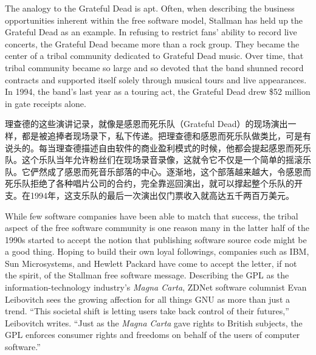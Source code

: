 \ifdefined\eng
The analogy to the Grateful Dead is apt. Often, when describing the business opportunities inherent within the free software model, Stallman has held up the Grateful Dead as an example. In refusing to restrict fans' ability to record live concerts, the Grateful Dead became more than a rock group. They became the center of a tribal community dedicated to Grateful Dead music. Over time, that tribal community became so large and so devoted that the band shunned record contracts and supported itself solely through musical tours and live appearances. In 1994, the band's last year as a touring act, the Grateful Dead drew \$52 million in gate receipts alone.
\fi

\ifdefined\chs
理查德的这些演讲记录，就像是感恩而死乐队（Grateful Dead）的现场演出一样，都是被追捧者现场录下，私下传递。把理查德和感恩而死乐队做类比，可是有说头的。每当理查德描述自由软件的商业盈利模式的时候，他都会提起感恩而死乐队。这个乐队当年允许粉丝们在现场录音录像，这就令它不仅是一个简单的摇滚乐队。它俨然成了感恩而死音乐部落的中心。逐渐地，这个部落越来越大，令感恩而死乐队拒绝了各种唱片公司的合约，完全靠巡回演出，就可以撑起整个乐队的开支。在1994年，这支乐队的最后一次演出仅门票收入就高达五千两百万美元。
\fi

\ifdefined\eng
While few software companies have been able to match that success, the tribal aspect of the free software community is one reason many in the latter half of the 1990s started to accept the notion that publishing software source code might be a good thing. Hoping to build their own loyal followings, companies such as IBM, Sun Microsystems, and Hewlett Packard have come to accept the letter, if not the spirit, of the Stallman free software message. Describing the GPL as the information-technology industry's \textit{Magna Carta}, ZDNet software columnist Evan Leibovitch sees the growing affection for all things GNU as more than just a trend. ``This societal shift is letting users take back control of their futures,'' Leibovitch writes. ``Just as the \textit{Magna Carta} gave rights to British subjects, the GPL enforces consumer rights and freedoms on behalf of the users of computer software.''
\fi

